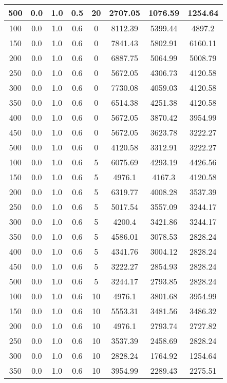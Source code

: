\documentclass[a4paper, 12pt]{extreport}
\begin{document}
\begin{itemize}
\begin{longtable}{|c|c|c|c|c|c|c|c|}
			500 & 0.0 & 1.0 & 0.5 & 20 & 2707.05 & 1076.59 & 1254.64 \\\hline
			100 & 0.0 & 1.0 & 0.6 & 0 & 8112.39 & 5399.44 & 4897.2 \\\hline
			150 & 0.0 & 1.0 & 0.6 & 0 & 7841.43 & 5802.91 & 6160.11 \\\hline
			200 & 0.0 & 1.0 & 0.6 & 0 & 6887.75 & 5064.99 & 5008.79 \\\hline
			250 & 0.0 & 1.0 & 0.6 & 0 & 5672.05 & 4306.73 & 4120.58 \\\hline
			300 & 0.0 & 1.0 & 0.6 & 0 & 7730.08 & 4059.03 & 4120.58 \\\hline
			350 & 0.0 & 1.0 & 0.6 & 0 & 6514.38 & 4251.38 & 4120.58 \\\hline
			400 & 0.0 & 1.0 & 0.6 & 0 & 5672.05 & 3870.42 & 3954.99 \\\hline
			450 & 0.0 & 1.0 & 0.6 & 0 & 5672.05 & 3623.78 & 3222.27 \\\hline
			500 & 0.0 & 1.0 & 0.6 & 0 & 4120.58 & 3312.91 & 3222.27 \\\hline
			100 & 0.0 & 1.0 & 0.6 & 5 & 6075.69 & 4293.19 & 4426.56 \\\hline
			150 & 0.0 & 1.0 & 0.6 & 5 & 4976.1 & 4167.3 & 4120.58 \\\hline
			200 & 0.0 & 1.0 & 0.6 & 5 & 6319.77 & 4008.28 & 3537.39 \\\hline
			250 & 0.0 & 1.0 & 0.6 & 5 & 5017.54 & 3557.09 & 3244.17 \\\hline
			300 & 0.0 & 1.0 & 0.6 & 5 & 4200.4 & 3421.86 & 3244.17 \\\hline
			350 & 0.0 & 1.0 & 0.6 & 5 & 4586.01 & 3078.53 & 2828.24 \\\hline
			400 & 0.0 & 1.0 & 0.6 & 5 & 4341.76 & 3004.12 & 2828.24 \\\hline
			450 & 0.0 & 1.0 & 0.6 & 5 & 3222.27 & 2854.93 & 2828.24 \\\hline
			500 & 0.0 & 1.0 & 0.6 & 5 & 3244.17 & 2793.85 & 2828.24 \\\hline
			100 & 0.0 & 1.0 & 0.6 & 10 & 4976.1 & 3801.68 & 3954.99 \\\hline
			150 & 0.0 & 1.0 & 0.6 & 10 & 5553.31 & 3481.56 & 3486.32 \\\hline
			200 & 0.0 & 1.0 & 0.6 & 10 & 4976.1 & 2793.74 & 2727.82 \\\hline
			250 & 0.0 & 1.0 & 0.6 & 10 & 3537.39 & 2458.69 & 2828.24 \\\hline
			300 & 0.0 & 1.0 & 0.6 & 10 & 2828.24 & 1764.92 & 1254.64 \\\hline
			350 & 0.0 & 1.0 & 0.6 & 10 & 3954.99 & 2289.43 & 2275.51 \\\hline

\end{longtable}
\end{itemize}
\end{document}
